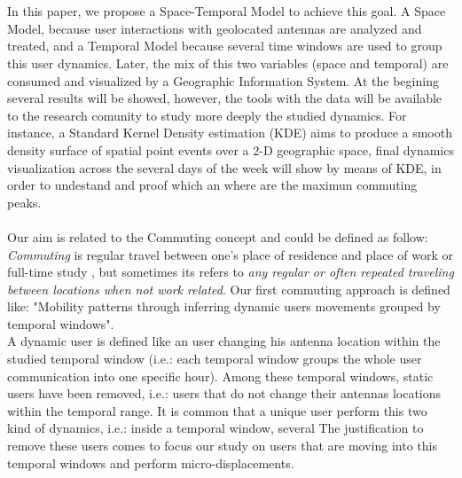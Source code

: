 \\
\\
In this paper, we propose a Space-Temporal Model to achieve this goal. A Space Model, because user interactions with geolocated antennas are analyzed and treated, and a Temporal Model because several time windows are used to group this user dynamics. Later, the mix of this two variables (space and temporal) are consumed and visualized by a Geographic Information System. At the begining several results will be showed, however, the tools with the data will be available to the research comunity to study more deeply the studied dynamics. For instance, a Standard Kernel Density estimation (KDE) aims to produce a smooth density surface of spatial point events over a 2-D geographic space\citep{SIM:SIM4780090616,5969036}, final dynamics visualization across the several days of the week will show by means of KDE, in order to undestand and proof which an where are the maximun commuting peaks. 
\\
\\
Our aim is related to the Commuting concept and could be defined as follow: \emph{Commuting} is regular travel between one's place of residence and place of work or full-time study \citep{wiki:commuting}, but  sometimes its refers to \emph{any regular or often repeated traveling between locations when not work related}. Our first commuting approach is defined like: "Mobility patterns through inferring dynamic users movements grouped by temporal windows". 
\\
A dynamic user is defined like an user changing his antenna location within the studied temporal window (i.e.: each temporal window groups the whole user communication into one specific hour). Among these temporal windows, static users have been removed, i.e.: users that do not change their antennas locations within the temporal range. It is common that a unique user perform this two kind of dynamics, i.e.: inside a temporal window, several 
The justification to remove these users comes to focus our study on users that are moving into this temporal windows and perform micro-displacements.
